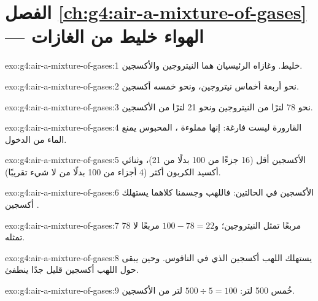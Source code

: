 \section*{الفصل \ref{ch:g4:air-a-mixture-of-gases} --- الهواء خليط من الغازات}

\begin{solution}{exo:g4:air-a-mixture-of-gases:1}
خليط. وغازاه الرئيسيان هما النيتروجين والأكسجين.
\end{solution}

\begin{solution}{exo:g4:air-a-mixture-of-gases:2}
نحو أربعة أخماس  نيتروجين، ونحو خمسه أكسجين.
\end{solution}

\begin{solution}{exo:g4:air-a-mixture-of-gases:3}
نحو 78 لترًا من النيتروجين ونحو 21 لترًا من الأكسجين.
\end{solution}

\begin{solution}{exo:g4:air-a-mixture-of-gases:4}
القارورة ليست فارغة: إنها مملوءة ،  المحبوس يمنع الماء
من الدخول.
\end{solution}

\begin{solution}{exo:g4:air-a-mixture-of-gases:5}
الأكسجين أقل (16 جزءًا من 100 بدلًا من 21)، وثنائي أكسيد الكربون أكثر
(4 أجزاء من 100 بدلًا من لا شيء تقريبًا).
\end{solution}

\begin{solution}{exo:g4:air-a-mixture-of-gases:6}
الأكسجين في الحالتين: فاللهب وجسمنا كلاهما يستهلك أكسجين
.
\end{solution}

\begin{solution}{exo:g4:air-a-mixture-of-gases:7}
78 مربعًا تمثل النيتروجين؛ و$100 - 78 = 22$ مربعًا لا تمثله.
\end{solution}

\begin{solution}{exo:g4:air-a-mixture-of-gases:8}
يستهلك اللهب أكسجين  الذي في الناقوس. وحين يبقى حول اللهب أكسجين
قليل جدًا ينطفئ.
\end{solution}

\begin{solution}{exo:g4:air-a-mixture-of-gases:9}
خُمس 500 لتر: $500 \div 5 = 100$ لتر من الأكسجين.
\end{solution}

